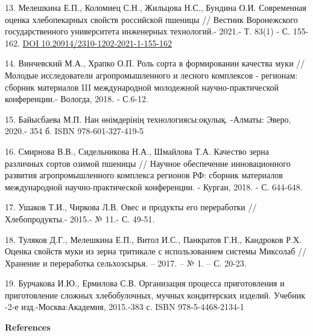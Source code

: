 \begin{references}
13. Мелешкина Е.П., Коломиец С.Н., Жильцова Н.С., Бундина О.И.
Современная оценка хлебопекарных свойств российской пшеницы // Вестник
Воронежского государственного университета инженерных технологий.-
2021.- Т. 83(1) - С. 155-162.
\href{https://doi.org/10.20914/2310-1202-2021-1-155-162}{DOI
10.20914/2310-1202-2021-1-155-162}

14. Винчевский М.А., Храпко О.П. Роль сорта в формировании качества муки
// Молодые исследователи агропромышленного и лесного комплексов -
регионам: сборник материалов III международной молодежной
научно-практической конференции.- Вологда, 2018. - С.6-12.

15. Байысбаева М.П. Нан өнімдерінің технологиясы:оқулық. -Алматы: Эверо,
2020.- 354 б. ISBN 978-601-327-419-5

16. Смирнова В.В., Сидельникова Н.А., Шмайлова Т.А. Качество зерна
различных сортов озимой пшеницы // Научное обеспечение инновационного
развития агропромышленного комплекса регионов РФ: сборник материалов
международной научно-практической конференции. - Курган, 2018. - С.
644-648.

17. Ушаков Т.И., Чиркова Л.В. Овес и продукты его переработки
//Хлебопродукты.- 2015.- № 11.- С. 49-51.

18. Туляков Д.Г., Мелешкина Е.П., Витол И.С., Панкратов Г.Н., Кандроков
Р.Х. Оценка свойств муки из зерна тритикале с использованием системы
Миксолаб // Хранение и переработка сельхозсырья. -- 2017. -- № 1. -- С.
20-23.

19. Бурчакова И.Ю., Ермилова С.В. Организация процесса приготовления и
приготовление сложных хлебобулочных, мучных кондитерских изделий.
Учебник -2-е изд.-Москва:Академия, 2015.-383 с. ISBN 978-5-4468-2134-1
\end{references}

\begin{center}
{\bfseries References}
\end{center}

